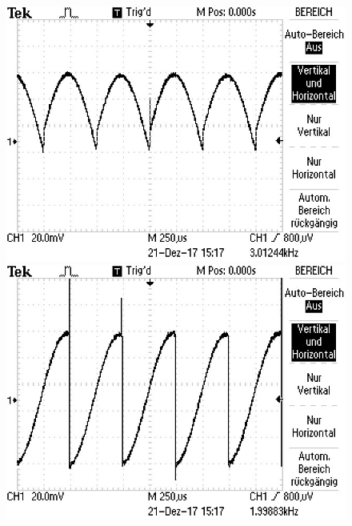 \begin{figure}
\vspace{2em}
\begin{minipage}{0.48\textwidth}
\centering
{}
\includegraphics[scale=.75]{content/images/90.jpg}
\end{minipage}
\begin{minipage}{0.48\textwidth}
\centering
{}
\includegraphics[scale=.75]{content/images/180.jpg}
\end{minipage}


\end{figure}
